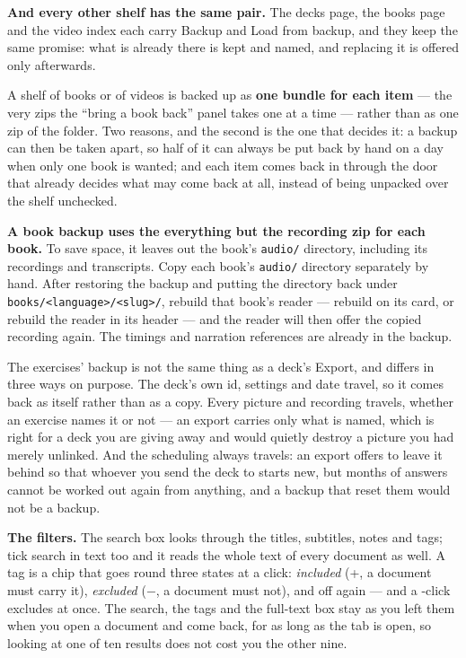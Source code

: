 \documentclass[11pt,oneside]{report}
\newcommand{\file}[1]{\texttt{#1}}
\newcommand{\key}[1]{\textsf{\small\fbox{#1}}}
\newcommand{\menu}[1]{\textsf{#1}}
\begin{document}
\textbf{And every other shelf has the same pair.} The decks page, the books
page and the video index each carry \menu{Backup} and \menu{Load from
backup}, and they keep the same promise: what is already there is kept and
named, and replacing it is offered only afterwards.

A shelf of books or of videos is backed up as \textbf{one bundle for each
item} --- the very zips the ``bring a book back'' panel takes one at a time
--- rather than as one zip of the folder. Two reasons, and the second is the
one that decides it: a backup can then be taken apart, so half of it can
always be put back by hand on a day when only one book is wanted; and each
item comes back in through the door that already decides what may come back
at all, instead of being unpacked over the shelf unchecked.

\textbf{A book backup uses the \menu{everything but the recording} zip for
each book.} To save space, it leaves out the book's \file{audio/} directory,
including its recordings and transcripts. Copy each book's \file{audio/}
directory separately by hand. After restoring the backup and putting the
directory back under \file{books/<language>/<slug>/}, rebuild that book's
reader --- \menu{rebuild} on its card, or \menu{rebuild the reader} in its
header --- and the reader will then offer the copied recording again. The timings and narration references are already
in the backup.

The exercises' backup is not the same thing as a deck's \menu{Export}, and
differs in three ways on purpose. The deck's own id, settings and date
travel, so it comes back as itself rather than as a copy. Every picture and
recording travels, whether an exercise names it or not --- an export carries
only what is named, which is right for a deck you are giving away and would
quietly destroy a picture you had merely unlinked. And the scheduling always
travels: an export offers to leave it behind so that whoever you send the
deck to starts new, but months of answers cannot be worked out again from
anything, and a backup that reset them would not be a backup.

\textbf{The filters.} The search box looks through the titles, subtitles,
notes and tags; tick \menu{search in text too} and it reads the whole text of
every document as well. A tag is a chip that goes round three states at a
click: \emph{included} (+, a document must carry it), \emph{excluded}
($-$, a document must not), and off again --- and a \key{Shift}-click
excludes at once. The search, the tags and the full-text box stay as you left
them when you open a document and come back, for as long as the tab is open,
so looking at one of ten results does not cost you the other nine.
\end{document}
